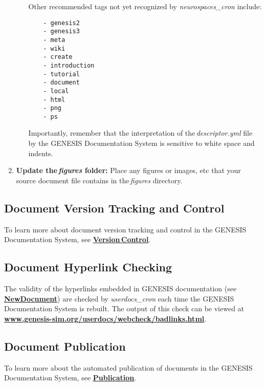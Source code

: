 \documentclass[12pt]{article}
\begin{document}
\begin{enumerate}
\begin{enumerate}
Other recommended tags not yet recognized by {\it neurospaces\_cron} include:
\begin{verbatim}
    - genesis2
    - genesis3
    - meta
    - wiki
    - create
    - introduction
    - tutorial
    - document
    - local
    - html
    - png
    - ps
\end{verbatim}
Importantly, remember that the interpretation of the\,{\it descriptor.yml} file by the GENESIS Documentation System is sensitive to white space and indents.
 
\end{enumerate}

\item {\bf Update the\,{\it figures} folder:} Place any figures or images, etc that your source document file contains in the\,{\it figures} directory.

\end{enumerate}

\subsection*{Document Version Tracking and Control}

To learn more about document version tracking and control in the GENESIS Documentation System, see \href{../version-control/version-control.tex}{\bf Version\,Control}.

\subsection*{Document Hyperlink Checking}

The validity of the hyperlinks embedded in GENESIS documentation (see \href{../NewDocument/NewDocument.tex}{\bf NewDocument}) are checked by {\it userdocs\_cron} each time the GENESIS Documentation System is rebuilt. The output of this check can be viewed at \href{http://www.genesis-sim.org/userdocs/webcheck/badlinks.html}{\bf www.genesis-sim.org/userdocs/webcheck/badlinks.html}.

\subsection*{Document Publication}

To learn more about the automated publication of documents in the GENESIS Documentation System, see \href{../publication/publication.tex}{\bf Publication}.
\end{document}
